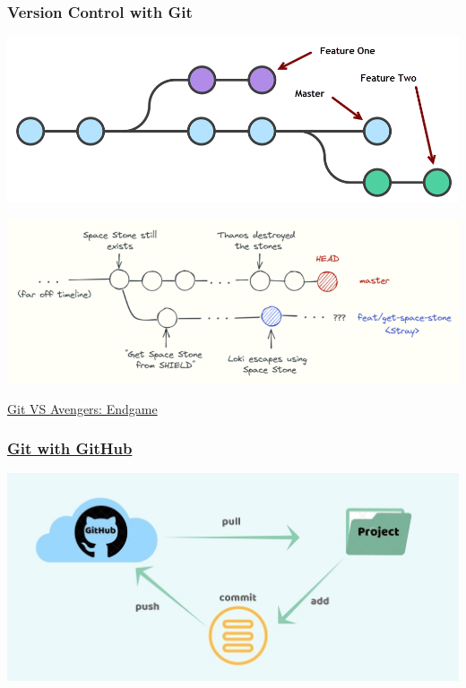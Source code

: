 \begin{frame}
    \frametitle{Version Control with Git}
    \centering
    \includegraphics[scale=0.35]{Bin/git.png}
    

    \vspace{0.5cm}
    \pause

    \includegraphics[scale=0.5]{Bin/git_endgame.PNG}

    \href{https://ljvmiranda921.github.io/notebook/2021/06/05/avengers-git/}{Git VS Avengers: Endgame}

\end{frame}


\begin{frame}
    \frametitle{\href{https://git-school.github.io/visualizing-git/}{Git with GitHub}}
    \centering
    \includegraphics[width=\textwidth, height=0.65\textheight, trim=30 0 50 0, clip]{Bin/github.jpg}

\end{frame}
